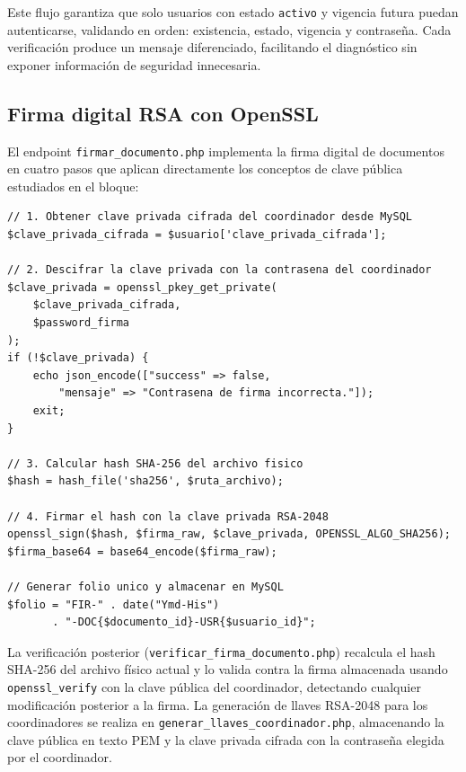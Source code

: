 \documentclass[10pt,letterpaper]{report}
\begin{document}
Este flujo garantiza que solo usuarios con estado \texttt{activo} y vigencia futura puedan autenticarse, validando en orden: existencia, estado, vigencia y contraseña. Cada verificación produce un mensaje diferenciado, facilitando el diagnóstico sin exponer información de seguridad innecesaria.

\subsection{Firma digital RSA con OpenSSL}
\label{sec:backend-firma}

El endpoint \texttt{firmar\_documento.php} implementa la firma digital de documentos en cuatro pasos que aplican directamente los conceptos de clave pública estudiados en el bloque:

\begin{lstlisting}[style=phpstyle, caption={Fragmento de firmar\_documento.php — firma RSA-2048 con SHA-256 (elaboración propia).}]
// 1. Obtener clave privada cifrada del coordinador desde MySQL
$clave_privada_cifrada = $usuario['clave_privada_cifrada'];

// 2. Descifrar la clave privada con la contrasena del coordinador
$clave_privada = openssl_pkey_get_private(
    $clave_privada_cifrada,
    $password_firma
);
if (!$clave_privada) {
    echo json_encode(["success" => false,
        "mensaje" => "Contrasena de firma incorrecta."]);
    exit;
}

// 3. Calcular hash SHA-256 del archivo fisico
$hash = hash_file('sha256', $ruta_archivo);

// 4. Firmar el hash con la clave privada RSA-2048
openssl_sign($hash, $firma_raw, $clave_privada, OPENSSL_ALGO_SHA256);
$firma_base64 = base64_encode($firma_raw);

// Generar folio unico y almacenar en MySQL
$folio = "FIR-" . date("Ymd-His")
       . "-DOC{$documento_id}-USR{$usuario_id}";
\end{lstlisting}

La verificación posterior (\texttt{verificar\_firma\_documento.php}) recalcula el hash SHA-256 del archivo físico actual y lo valida contra la firma almacenada usando \texttt{openssl\_verify} con la clave pública del coordinador, detectando cualquier modificación posterior a la firma. La generación de llaves RSA-2048 para los coordinadores se realiza en \texttt{generar\_llaves\_coordinador.php}, almacenando la clave pública en texto PEM y la clave privada cifrada con la contraseña elegida por el coordinador.
\end{document}
